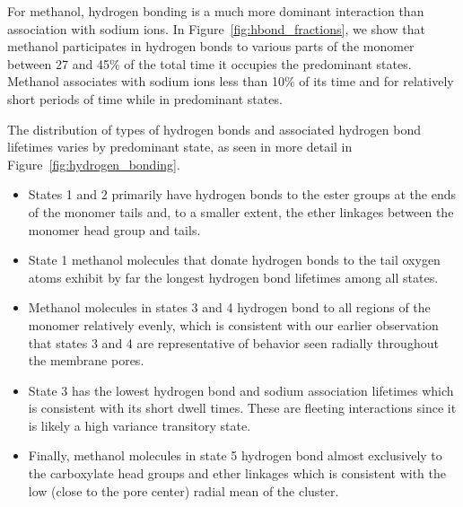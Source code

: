 \documentclass[journal=jpcbfk,manuscript=article]{achemso}
\begin{document}
  For methanol, hydrogen bonding is a much more dominant interaction than association
  with sodium ions. In Figure~\ref{fig:hbond_fractions}, we show that methanol 
  participates in hydrogen bonds to various parts of the monomer between 27 and
  45\% of the total time it occupies the predominant states. Methanol associates 
  with sodium ions less than 10\% of its time and for relatively short periods 
  of time while in predominant states. 

  The distribution of types of hydrogen bonds and associated hydrogen bond lifetimes
  varies by predominant state, as seen in more detail in Figure~\ref{fig:hydrogen_bonding}.
  \begin{itemize}
  \item States 1 and 2 primarily have hydrogen bonds to the 
  ester groups at the ends of the monomer tails and, to a smaller extent, the ether 
  linkages between the monomer head group and tails. 
  \item State 1 methanol molecules that
  donate hydrogen bonds to the tail oxygen atoms exhibit by far the longest hydrogen
  bond lifetimes among all states. 
  \item Methanol molecules in states 3 and 4 hydrogen 
  bond to all regions of the monomer relatively evenly, which is consistent with our earlier observation that
  states 3 and 4 are representative of behavior seen radially throughout the membrane
  pores. 
  \item State 3 has the lowest hydrogen bond and sodium association lifetimes which
  is consistent with its short dwell times. These are fleeting interactions since it
  is likely a high variance transitory state. 
  \item Finally, methanol molecules in state 5
  hydrogen bond almost exclusively to the carboxylate head groups and ether linkages 
  which is consistent with the low (close to the pore center) radial mean of the 
  cluster.
  \end{itemize}
\end{document}

